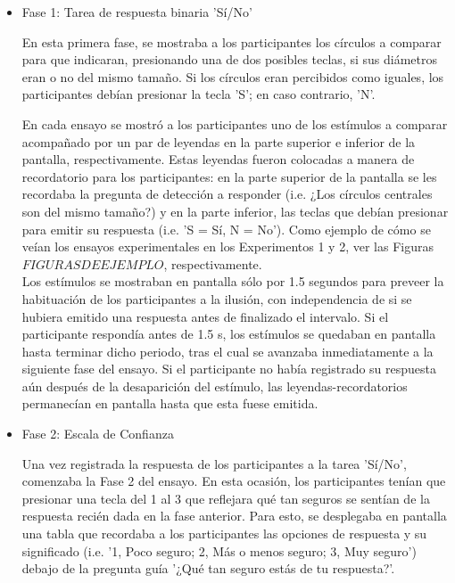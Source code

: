 \begin{itemize}
\item Fase 1: Tarea de respuesta binaria 'Sí/No'

En esta primera fase, se mostraba a los participantes los círculos a comparar para que indicaran, presionando una de dos posibles teclas, si sus diámetros eran o no del mismo tamaño. Si los círculos eran percibidos como iguales, los participantes debían presionar la tecla 'S'; en caso contrario, 'N'.

En cada ensayo se mostró a los participantes uno de los estímulos a comparar acompañado por un par de leyendas en la parte superior e inferior de la pantalla, respectivamente. Estas leyendas fueron colocadas a manera de recordatorio para los participantes: en la parte superior de la pantalla se les recordaba la pregunta de detección a responder (i.e. ¿Los círculos centrales son del mismo tamaño?) y en la parte inferior, las teclas que debían presionar para emitir su respuesta (i.e. 'S = Sí, N = No'). Como ejemplo de cómo se veían los ensayos experimentales en los Experimentos 1 y 2, ver las Figuras $FIGURAS DE EJEMPLO$, respectivamente.\\

Los estímulos se mostraban en pantalla sólo por 1.5 segundos para preveer la habituación de los participantes a la ilusión, con independencia de si se hubiera emitido una respuesta antes de finalizado el intervalo. Si el participante respondía antes de 1.5 s, los estímulos se quedaban en pantalla hasta terminar dicho periodo, tras el cual se avanzaba inmediatamente a la siguiente fase del ensayo. Si el participante no había registrado su respuesta aún después de la desaparición del estímulo, las leyendas-recordatorios permanecían en pantalla hasta que esta fuese emitida.\\

\item Fase 2: Escala de Confianza

Una vez registrada la respuesta de los participantes a la tarea 'Sí/No', comenzaba la Fase 2 del ensayo. En esta ocasión, los participantes tenían que presionar una tecla del 1 al 3 que reflejara qué tan seguros se sentían de la respuesta recién dada en la fase anterior. Para esto, se desplegaba en pantalla una tabla que recordaba a los participantes las opciones de respuesta y su significado (i.e. '1, Poco seguro; 2, Más o menos seguro; 3, Muy seguro') debajo de la pregunta guía '¿Qué tan seguro estás de tu respuesta?'. \\


\end{itemize}
